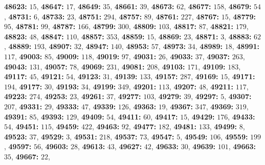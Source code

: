\textsf{\bfseries 48623:} $15$, \textsf{\bfseries 48647:} $17$, \textsf{\bfseries 48649:} $35$, \textsf{\bfseries 48661:} $39$, \textsf{\bfseries 48673:} $62$, \textsf{\bfseries 48677:} $158$, \textsf{\bfseries 48679:} $54$, \textsf{\bfseries 48731:} $6$, \textsf{\bfseries 48733:} $23$, \textsf{\bfseries 48751:} $294$, \textsf{\bfseries 48757:} $89$, \textsf{\bfseries 48761:} $227$, \textsf{\bfseries 48767:} $15$, \textsf{\bfseries 48779:} $95$, \textsf{\bfseries 48781:} $99$, \textsf{\bfseries 48787:} $166$, \textsf{\bfseries 48799:} $300$, \textsf{\bfseries 48809:} $103$, \textsf{\bfseries 48817:} $87$, \textsf{\bfseries 48821:} $179$, \textsf{\bfseries 48823:} $48$, \textsf{\bfseries 48847:} $110$, \textsf{\bfseries 48857:} $353$, \textsf{\bfseries 48859:} $15$, \textsf{\bfseries 48869:} $23$, \textsf{\bfseries 48871:} $3$, \textsf{\bfseries 48883:} $62$, \textsf{\bfseries 48889:} $193$, \textsf{\bfseries 48907:} $32$, \textsf{\bfseries 48947:} $140$, \textsf{\bfseries 48953:} $57$, \textsf{\bfseries 48973:} $34$, \textsf{\bfseries 48989:} $18$, \textsf{\bfseries 48991:} $117$, \textsf{\bfseries 49003:} $85$, \textsf{\bfseries 49009:} $118$, \textsf{\bfseries 49019:} $97$, \textsf{\bfseries 49031:} $26$, \textsf{\bfseries 49033:} $37$, \textsf{\bfseries 49037:} $263$, \textsf{\bfseries 49043:} $131$, \textsf{\bfseries 49057:} $78$, \textsf{\bfseries 49069:} $231$, \textsf{\bfseries 49081:} $208$, \textsf{\bfseries 49103:} $171$, \textsf{\bfseries 49109:} $183$, \textsf{\bfseries 49117:} $45$, \textsf{\bfseries 49121:} $54$, \textsf{\bfseries 49123:} $31$, \textsf{\bfseries 49139:} $133$, \textsf{\bfseries 49157:} $287$, \textsf{\bfseries 49169:} $15$, \textsf{\bfseries 49171:} $194$, \textsf{\bfseries 49177:} $30$, \textsf{\bfseries 49193:} $34$, \textsf{\bfseries 49199:} $349$, \textsf{\bfseries 49201:} $113$, \textsf{\bfseries 49207:} $48$, \textsf{\bfseries 49211:} $117$, \textsf{\bfseries 49223:} $274$, \textsf{\bfseries 49253:} $23$, \textsf{\bfseries 49261:} $37$, \textsf{\bfseries 49277:} $103$, \textsf{\bfseries 49279:} $39$, \textsf{\bfseries 49297:} $5$, \textsf{\bfseries 49307:} $207$, \textsf{\bfseries 49331:} $29$, \textsf{\bfseries 49333:} $47$, \textsf{\bfseries 49339:} $126$, \textsf{\bfseries 49363:} $19$, \textsf{\bfseries 49367:} $347$, \textsf{\bfseries 49369:} $319$, \textsf{\bfseries 49391:} $85$, \textsf{\bfseries 49393:} $129$, \textsf{\bfseries 49409:} $54$, \textsf{\bfseries 49411:} $60$, \textsf{\bfseries 49417:} $15$, \textsf{\bfseries 49429:} $176$, \textsf{\bfseries 49433:} $54$, \textsf{\bfseries 49451:} $115$, \textsf{\bfseries 49459:} $422$, \textsf{\bfseries 49463:} $92$, \textsf{\bfseries 49477:} $182$, \textsf{\bfseries 49481:} $133$, \textsf{\bfseries 49499:} $8$, \textsf{\bfseries 49523:} $37$, \textsf{\bfseries 49529:} $3$, \textsf{\bfseries 49531:} $218$, \textsf{\bfseries 49537:} $73$, \textsf{\bfseries 49547:} $5$, \textsf{\bfseries 49549:} $106$, \textsf{\bfseries 49559:} $199$, \textsf{\bfseries 49597:} $56$, \textsf{\bfseries 49603:} $28$, \textsf{\bfseries 49613:} $43$, \textsf{\bfseries 49627:} $42$, \textsf{\bfseries 49633:} $30$, \textsf{\bfseries 49639:} $101$, \textsf{\bfseries 49663:} $35$, \textsf{\bfseries 49667:} $22$, 
